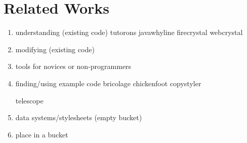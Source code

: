 \documentclass{sigchi}
\newcommand{\xray}{XRAY\xspace}
\begin{document}
\section{Related Works}
\begin{enumerate}
    \item understanding (existing code)
    tutorons \cite{Head_tutorons_generating_sketchy_no_conf_no_year}
    javawhyline \cite{java_whyline_Ko_CHI_2009}
    firecrystal \cite{firecrystal_oney_ieee_2013}
    webcrystal \cite{webcrystal_Chang_CHI_2012}
    
    \item modifying (existing code)
    
    \item tools for novices or non-programmers
    
    \item finding/using example code
    bricolage \cite{bricolage_Kumar_CHI_2011}
    chickenfoot \cite{auto_and_customization_of_rendered_web_Bolin_UIST_2005}
    copystyler \cite{copystyler_fitzgerald_mastersthesis_2008}

    telescope \cite{telescope_Hibschman_UIST_2016}
    \item data systems/stylesheets (empty bucket)
    \item place in a bucket
    
\end{enumerate}



\end{document}
